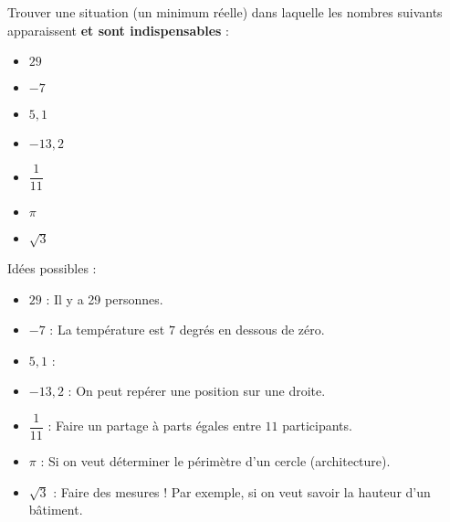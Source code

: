 \documentclass{beamer}
\begin{document}
\begin{frame}
	Trouver une situation (un minimum réelle) dans laquelle les nombres suivants apparaissent \textbf{et sont indispensables} :
	\begin{itemize}
		\item $29$
		      \pause
		\item $-7$
		      \pause
		\item $5,1$
		      \pause
		\item $-13,2$
		      \pause
		\item $\dfrac{1}{11}$
		      \pause
		\item $π$
		      \pause
		\item $\sqrt{3}$
	\end{itemize}
\end{frame}


\begin{frame}
	Idées possibles :
	\begin{itemize}
		\item $29$ : Il y a 29 personnes.
		\item $-7$ : La température est $7$ degrés en dessous de zéro.
		\item $5,1$ :
		\item $-13,2$ : On peut repérer une position sur une droite.
		\item $\dfrac{1}{11}$ : Faire un partage à parts égales entre $11$ participants.
		\item $π$ : Si on veut déterminer le périmètre d'un cercle (architecture).
		\item $\sqrt{3}$ : Faire des mesures ! Par exemple, si on veut savoir la hauteur d'un bâtiment.
	\end{itemize}
\end{frame}
\end{document}

